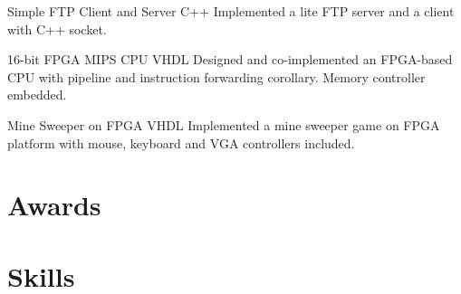 \documentclass[11pt,a4paper]{moderncv/moderncv}
\begin{document}
{Simple FTP Client and Server}
{C++}
{}{}
{
Implemented a lite FTP server and a client with C++ socket.
}

{16-bit FPGA MIPS CPU}
{VHDL}
{}{}
{
Designed and co-implemented an FPGA-based CPU with pipeline and instruction forwarding corollary. Memory controller embedded.
}

{Mine Sweeper on FPGA}
{VHDL}
{}{}
{
Implemented a mine sweeper game on FPGA platform with mouse, keyboard and VGA controllers included.
}



\nocite{*}


\section{Awards}


\section{Skills}

\closesection{}                   %
\renewcommand{\listitemsymbol}{-} %
\end{document}
